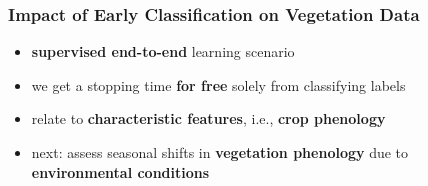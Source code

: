 \begin{frame}
	\frametitle{Impact of Early Classification on Vegetation Data}
	
	\Large
	
	\begin{itemize}[itemsep=1em]
		\item<1-> \textbf{supervised end-to-end} learning scenario
		\item<2-> we get a stopping time \textbf{for free} solely from classifying labels
		\item<3-> relate to \textbf{characteristic features}, i.e., \textbf{crop phenology}
		\item<4-> next: assess seasonal shifts in \textbf{vegetation phenology} due to \textbf{environmental conditions}
	\end{itemize}
	
\end{frame}

